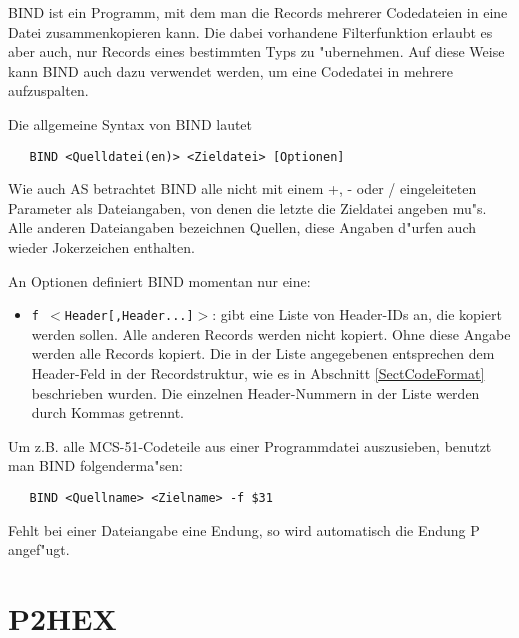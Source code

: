 \documentclass[12pt,a4paper,twoside]{report}
\newcommand{\tty}[1]{{\tt #1}}
\begin{document}
{BIND ist ein Programm, mit dem man die Records mehrerer Codedateien
in eine Datei zusammenkopieren kann.  Die dabei vorhandene Filterfunktion
erlaubt es aber auch, nur Records eines bestimmten Typs zu "ubernehmen.
Auf diese Weise kann BIND auch dazu verwendet werden, um eine Codedatei
in mehrere aufzuspalten.
\par
Die allgemeine Syntax von BIND lautet
\begin{verbatim}
   BIND <Quelldatei(en)> <Zieldatei> [Optionen]
\end{verbatim}
Wie auch AS betrachtet BIND alle nicht mit einem +, - oder / eingeleiteten
Parameter als Dateiangaben, von denen die letzte die Zieldatei angeben
mu"s.  Alle anderen Dateiangaben bezeichnen Quellen, diese Angaben d"urfen
auch wieder Jokerzeichen enthalten.
\par
An Optionen definiert BIND momentan nur eine:
\begin{itemize}
\item{\tty{f $<$Header[,Header...]$>$}: gibt eine Liste von Header-IDs
      an, die kopiert werden sollen.  Alle anderen Records werden
      nicht kopiert.  Ohne diese Angabe werden alle Records kopiert.
      Die in der Liste angegebenen entsprechen dem Header-Feld in der
      Recordstruktur, wie es in Abschnitt \ref{SectCodeFormat} beschrieben wurden. Die
      einzelnen Header-Nummern in der Liste werden durch Kommas getrennt.}
\end{itemize}
Um z.B. alle MCS-51-Codeteile aus einer Programmdatei auszusieben,
benutzt man BIND folgenderma"sen:
\begin{verbatim}
   BIND <Quellname> <Zielname> -f $31
\end{verbatim}
Fehlt bei einer Dateiangabe eine Endung, so wird automatisch die Endung
P angef"ugt.


\section{P2HEX}

}
\end{document}
